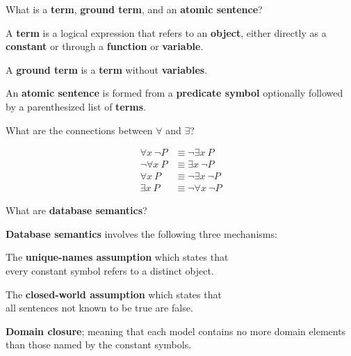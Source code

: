 \begin{flashcard}[Question]{What is a \textbf{term}, \textbf{ground term}, and an \textbf{atomic sentence}?}
\begin{center}
A \textbf{term} is a logical expression that refers to an \textbf{object}, either directly as a \textbf{constant} or through a \textbf{function} or \textbf{variable}.

\medskip

A \textbf{ground term} is a \textbf{term} without \textbf{variables}.

\medskip

An \textbf{atomic sentence} is formed from a \textbf{predicate symbol} optionally followed by a parenthesized list of \textbf{terms}.
\end{center}
\end{flashcard}

\begin{flashcard}[Question]{What are the connections between $\forall$ and $\exists$?}
\begin{center}
{\begin{align*}
\forall x ~ \neg P &\equiv \neg \exists x ~ P\\
\neg \forall x ~ P &\equiv \exists x ~ \neg P\\
\forall x ~ P &\equiv \neg \exists x ~ \neg P\\
\exists x ~ P &\equiv \neg \forall x ~ \neg P
\end{align*}}
\end{center}
\end{flashcard}

\begin{flashcard}[Question]{What are \textbf{database semantics}?}
\begin{center}
\textbf{Database semantics} involves the following three mechanisms:

\medskip

The \textbf{unique-names assumption} which states that\\every constant symbol refers to a distinct object.

\medskip

The \textbf{closed-world assumption} which states that\\all sentences not known to be true are false.

\medskip

\textbf{Domain closure}; meaning that each model contains no more domain elements than those named by the constant symbols.
\end{center}
\end{flashcard}

